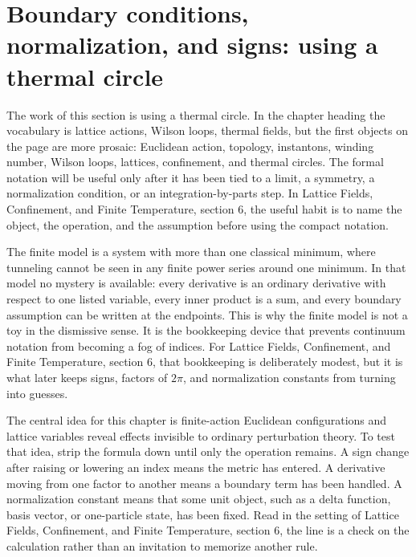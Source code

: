 \section{Boundary conditions, normalization, and signs: using a thermal circle}













The work of this section is using a thermal circle.  In the chapter heading the vocabulary is lattice actions, Wilson loops, thermal fields, but the first objects on the page are more prosaic: Euclidean action, topology, instantons, winding number, Wilson loops, lattices, confinement, and thermal circles.  The formal notation will be useful only after it has been tied to a limit, a symmetry, a normalization condition, or an integration-by-parts step.  In Lattice Fields, Confinement, and Finite Temperature, section 6, the useful habit is to name the object, the operation, and the assumption before using the compact notation.

The finite model is a system with more than one classical minimum, where tunneling cannot be seen in any finite power series around one minimum.  In that model no mystery is available: every derivative is an ordinary derivative with respect to one listed variable, every inner product is a sum, and every boundary assumption can be written at the endpoints.  This is why the finite model is not a toy in the dismissive sense.  It is the bookkeeping device that prevents continuum notation from becoming a fog of indices.  For Lattice Fields, Confinement, and Finite Temperature, section 6, that bookkeeping is deliberately modest, but it is what later keeps signs, factors of \(2\pi\), and normalization constants from turning into guesses.

The central idea for this chapter is finite-action Euclidean configurations and lattice variables reveal effects invisible to ordinary perturbation theory.  To test that idea, strip the formula down until only the operation remains.  A sign change after raising or lowering an index means the metric has entered.  A derivative moving from one factor to another means a boundary term has been handled.  A normalization constant means that some unit object, such as a delta function, basis vector, or one-particle state, has been fixed.  Read in the setting of Lattice Fields, Confinement, and Finite Temperature, section 6, the line is a check on the calculation rather than an invitation to memorize another rule.

